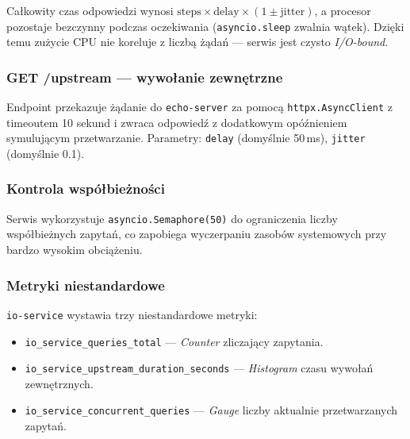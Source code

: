 Całkowity czas odpowiedzi wynosi $\text{steps} \times \text{delay} \times (1 \pm \text{jitter})$, a procesor pozostaje bezczynny podczas oczekiwania (\texttt{asyncio.sleep} zwalnia wątek). Dzięki temu zużycie CPU nie koreluje z liczbą żądań — serwis jest czysto \textit{I/O-bound}.



\subsubsection{GET /upstream — wywołanie zewnętrzne}

Endpoint przekazuje żądanie do \texttt{echo-server} za pomocą \texttt{httpx.AsyncClient} z timeoutem 10 sekund i zwraca odpowiedź z dodatkowym opóźnieniem symulującym przetwarzanie. Parametry: \texttt{delay} (domyślnie 50\,ms), \texttt{jitter} (domyślnie 0.1).

\subsubsection{Kontrola współbieżności}

Serwis wykorzystuje \texttt{asyncio.Semaphore(50)} do ograniczenia liczby współbieżnych zapytań, co zapobiega wyczerpaniu zasobów systemowych przy bardzo wysokim obciążeniu.



\subsubsection{Metryki niestandardowe}

\texttt{io-service} wystawia trzy niestandardowe metryki:
\begin{itemize}
  \item \texttt{io\_service\_queries\_total} — \textit{Counter} zliczający zapytania.
  \item \texttt{io\_service\_upstream\_duration\_seconds} — \textit{Histogram} czasu wywołań zewnętrznych.
  \item \texttt{io\_service\_concurrent\_queries} — \textit{Gauge} liczby aktualnie przetwarzanych zapytań.
\end{itemize}

